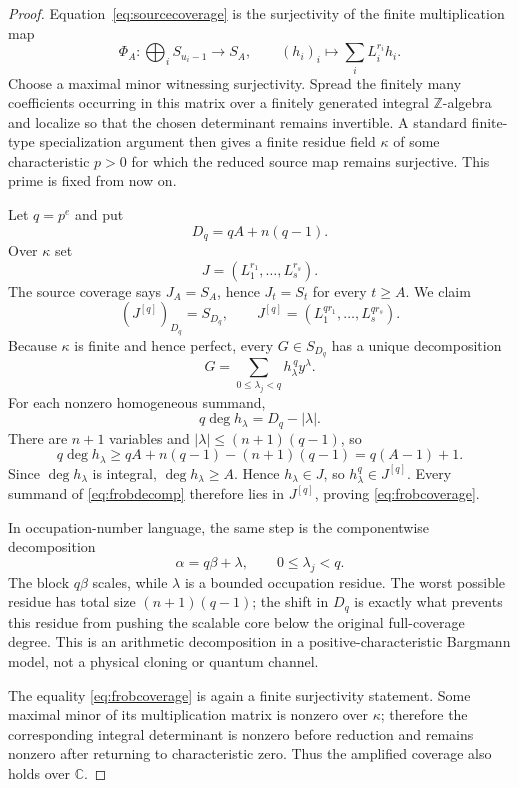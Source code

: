 \documentclass[11pt]{article}
\theoremstyle{remark}
\newcommand{\CC}{\mathbb C}
\begin{document}
\begin{proof}
Equation~\eqref{eq:sourcecoverage} is the surjectivity of the finite multiplication map
\[
  \Phi_A:\bigoplus_i S_{u_i-1}\longrightarrow S_A,
  \qquad
  (h_i)_i\longmapsto\sum_iL_i^{r_i}h_i.
\]
Choose a maximal minor witnessing surjectivity.  Spread the finitely many coefficients occurring in this matrix over a finitely generated integral $\mathbb Z$-algebra and localize so that the chosen determinant remains invertible.  A standard finite-type specialization argument then gives a finite residue field $\kappa$ of some characteristic $p>0$ for which the reduced source map remains surjective.  This prime is fixed from now on.

Let $q=p^e$ and put
\[
  D_q=qA+n(q-1).
\]
Over $\kappa$ set
\[
  J=(L_1^{r_1},\ldots,L_s^{r_s}).
\]
The source coverage says $J_A=S_A$, hence $J_t=S_t$ for every $t\ge A$.  We claim
\begin{equation}
  (J^{[q]})_{D_q}=S_{D_q},
  \qquad
  J^{[q]}=(L_1^{qr_1},\ldots,L_s^{qr_s}).
  \label{eq:frobcoverage}
\end{equation}
Because $\kappa$ is finite and hence perfect, every $G\in S_{D_q}$ has a unique decomposition
\begin{equation}
  G=\sum_{0\le\lambda_j<q} h_\lambda^{\,q}y^\lambda.
  \label{eq:frobdecomp}
\end{equation}
For each nonzero homogeneous summand,
\[
  q\deg h_\lambda=D_q-|\lambda|.
\]
There are $n+1$ variables and $|\lambda|\le(n+1)(q-1)$, so
\[
  q\deg h_\lambda
  \ge qA+n(q-1)-(n+1)(q-1)
  =q(A-1)+1.
\]
Since $\deg h_\lambda$ is integral, $\deg h_\lambda\ge A$.  Hence $h_\lambda\in J$, so $h_\lambda^q\in J^{[q]}$.  Every summand of \eqref{eq:frobdecomp} therefore lies in $J^{[q]}$, proving \eqref{eq:frobcoverage}.

In occupation-number language, the same step is the componentwise decomposition
\[
  \alpha=q\beta+\lambda,
  \qquad 0\le\lambda_j<q.
\]
The block $q\beta$ scales, while $\lambda$ is a bounded occupation residue.  The worst possible residue has total size $(n+1)(q-1)$; the shift in $D_q$ is exactly what prevents this residue from pushing the scalable core below the original full-coverage degree.  This is an arithmetic decomposition in a positive-characteristic Bargmann model, not a physical cloning or quantum channel.

The equality \eqref{eq:frobcoverage} is again a finite surjectivity statement.  Some maximal minor of its multiplication matrix is nonzero over $\kappa$; therefore the corresponding integral determinant is nonzero before reduction and remains nonzero after returning to characteristic zero.  Thus the amplified coverage also holds over $\CC$.


\end{proof}
\end{document}
